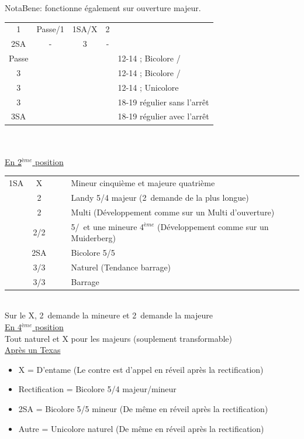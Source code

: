 \documentclass[a4paper, oneside, 11pt]{report}
\begin{document}
		NotaBene: fonctionne également sur ouverture majeur.\\
		\begin{tabular}{cccc|l}
		1\coeur & Passe/1\pique & 1SA/X & 2\pique &\\
		2SA & - & 3\trefle & - &\\
		Passe &&&& 12-14 ; Bicolore \coeur/\trefle\\
		3\carreau &&&& 12-14 ; Bicolore \coeur/\carreau\\
		3\coeur &&&& 12-14 ; Unicolore \coeur\\
		3\pique &&&& 18-19 régulier sans l'arrêt \pique\\
		3SA &&&& 18-19 régulier avec l'arrêt \pique\\
		\end{tabular}\\\\
		

	\underline{En 2$^{ème}$ position}
	
	\begin{tabular}{cccc|l}
	1SA & X &&& Mineur cinquième et majeure quatrième\\
	& 2\trefle &&& Landy 5/4 majeur (2\carreau\ demande de la plus longue)\\
	& 2\carreau &&& Multi (Développement comme sur un Multi d'ouverture)\\
	& 2\coeur/2\pique &&& 5\coeur/\pique\ et une mineure 4$^{ème}$ (Développement comme sur un Muiderberg)\\
	& 2SA &&& Bicolore 5\trefle/5\carreau\\
	& 3\trefle/3\carreau &&& Naturel (Tendance barrage)\\
	& 3\coeur/3\pique &&& Barrage\\
	\end{tabular}\\
	Sur le X, 2\trefle\ demande la mineure et 2\carreau\ demande la majeure\\
	
	\underline{En 4$^{ème}$ position}\\
	Tout naturel et X pour les majeurs (souplement transformable)\\

	\underline{Après un Texas}
	
	\begin{itemize}
	\item X = D'entame (Le contre est d'appel en réveil après la rectification)
	\item Rectification = Bicolore 5/4 majeur/mineur
	\item 2SA = Bicolore 5/5 mineur (De même en réveil après la rectification)
	\item Autre = Unicolore naturel (De même en réveil après la rectification)\\
	\end{itemize}
\end{document}
